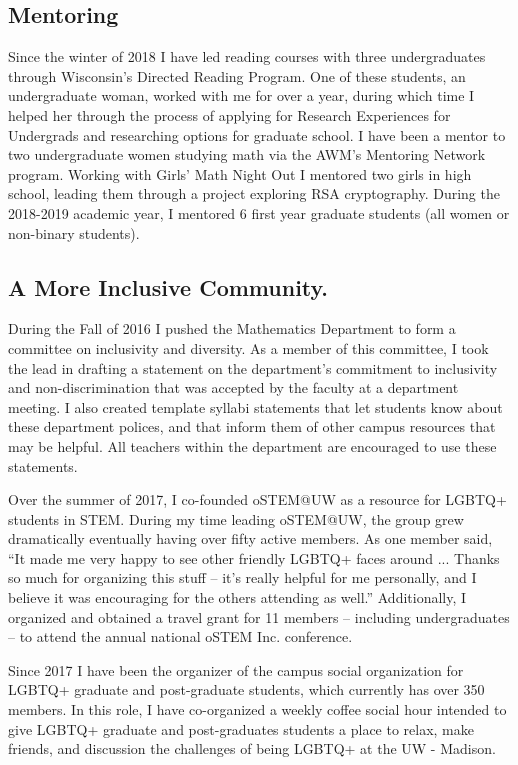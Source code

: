 \documentclass[10pt,reqno]{amsart}
\theoremstyle{remark}
\begin{document}
\subsection{Mentoring}
Since the winter of 2018 I have led reading courses with three undergraduates through Wisconsin's Directed Reading Program. One of these students, an undergraduate woman, worked with me for over a year, during which time I helped her through the process of applying for Research Experiences for Undergrads and researching options for graduate school. I have been a mentor to two undergraduate women studying math via the AWM's Mentoring Network program. Working with Girls' Math Night Out I mentored two girls in high school, leading them through a project exploring RSA cryptography. During the 2018-2019 academic year, I mentored 6 first year graduate students (all women or non-binary students). 


\subsection{A More Inclusive Community.} During the Fall of 2016 I pushed the Mathematics Department to form a committee on inclusivity and diversity. As a member of this committee, I took the lead in drafting a statement on the department's commitment to inclusivity and non-discrimination that was  accepted by the faculty at a department meeting. I also created template syllabi statements that let students know about these department polices, and that inform them of other campus resources that may be helpful. All teachers within the department are  encouraged to use these statements. 

Over the summer of 2017, I co-founded oSTEM@UW as a resource for LGBTQ+ students in STEM. During my time leading oSTEM@UW, the group grew dramatically eventually having over fifty active members. As one member said, ``It made me very happy to see other friendly LGBTQ+ faces around ... Thanks so much for organizing this stuff -- it's really helpful for me personally, and I believe it was encouraging for the others attending as well.'' Additionally, I organized and obtained a travel grant for 11 members -- including undergraduates -- to attend the annual national oSTEM Inc. conference. 

Since 2017 I have been the organizer of the campus social organization for LGBTQ+ graduate and post-graduate students, which currently has over 350 members. In this role, I have co-organized a weekly coffee social hour intended to give LGBTQ+ graduate and post-graduates students a place to relax, make friends, and discussion the challenges of being LGBTQ+ at the UW - Madison.
\end{document}
